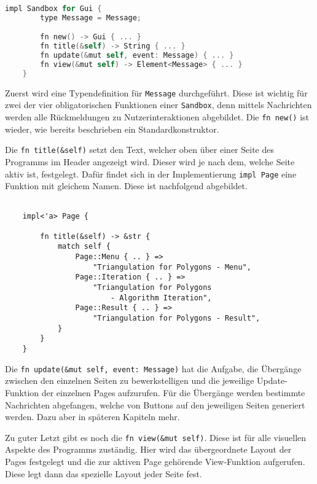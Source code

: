 \begin{lstlisting}[language=C]
    impl Sandbox for Gui {
        type Message = Message;

        fn new() -> Gui { ... }
        fn title(&self) -> String { ... }
        fn update(&mut self, event: Message) { ... }
        fn view(&mut self) -> Element<Message> { ... }
    }
\end{lstlisting}

Zuerst wird eine Typendefinition für \lstinline{Message} durchgeführt. Diese ist wichtig für zwei der vier obligatorischen Funktionen einer \lstinline{Sandbox}, denn 
mittels Nachrichten werden alle Rückmeldungen zu Nutzerinteraktionen abgebildet. Die \lstinline{fn new()} ist wieder, wie bereits beschrieben ein Standardkonstruktor.

Die \lstinline{fn title(&self)} setzt den Text, welcher oben über einer Seite des Programms im Header angezeigt wird. Dieser wird je nach dem, welche Seite aktiv ist,
festgelegt. Dafür findet sich in der Implementierung \lstinline{impl Page} eine Funktion mit gleichem Namen. Diese ist nachfolgend abgebildet.

\begin{lstlisting}
  
    impl<'a> Page {
        
        fn title(&self) -> &str {
            match self {
                Page::Menu { .. } => 
                    "Triangulation for Polygons - Menu",
                Page::Iteration { .. } => 
                    "Triangulation for Polygons 
                        - Algorithm Iteration",
                Page::Result { .. } => 
                    "Triangulation for Polygons - Result",
            }
        }
    }

\end{lstlisting}

Die \lstinline{fn update(&mut self, event: Message)} hat die Aufgabe, die Übergänge zwischen den einzelnen Seiten zu bewerkstelligen und die jeweilige Update-Funktion 
der einzelnen Pages aufzurufen. Für die Übergänge werden bestimmte Nachrichten abgefangen, welche von Buttons auf den jeweiligen Seiten generiert werden. Dazu aber in späteren Kapiteln mehr.

Zu guter Letzt gibt es noch die \lstinline{fn view(&mut self)}. Diese ist für alle visuellen Aspekte des Programms zuständig. Hier wird das übergeordnete Layout der Pages festgelegt und die 
zur aktiven Page gehörende View-Funktion aufgerufen. Diese legt dann das spezielle Layout jeder Seite fest.

